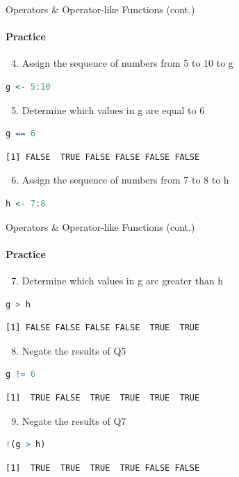 \begin{frame}[fragile]{Operators \& Operator-like Functions (cont.)}
\framesubtitle{Practice}
\begin{enumerate}\setcounter{enumi}{3}
  \item Assign the sequence of numbers from 5 to 10 to g
\end{enumerate}
\begin{lstlisting}[language=R]
g <- 5:10
\end{lstlisting}
\begin{enumerate}\setcounter{enumi}{4}
  \item Determine which values in g are equal to 6
\end{enumerate}
\begin{lstlisting}[language=R]
g == 6
\end{lstlisting}
\begin{lstlisting}[style=output]
[1] FALSE  TRUE FALSE FALSE FALSE FALSE
\end{lstlisting}
\begin{enumerate}\setcounter{enumi}{5}
  \item Assign the sequence of numbers from 7 to 8 to h
\end{enumerate}
\begin{lstlisting}[language=R]
h <- 7:8
\end{lstlisting}
\end{frame}

\begin{frame}[fragile]{Operators \& Operator-like Functions (cont.)}
\framesubtitle{Practice}
\begin{enumerate}\setcounter{enumi}{6}
  \item Determine which values in g are greater than h
\end{enumerate}
\begin{lstlisting}[language=R]
g > h
\end{lstlisting}
\begin{lstlisting}[style=output]
[1] FALSE FALSE FALSE FALSE  TRUE  TRUE
\end{lstlisting}
\begin{enumerate}\setcounter{enumi}{7}
  \item Negate the results of Q5
\end{enumerate}
\begin{lstlisting}[language=R]
g != 6
\end{lstlisting}
\begin{lstlisting}[style=output]
[1]  TRUE FALSE  TRUE  TRUE  TRUE  TRUE
\end{lstlisting}
\begin{enumerate}\setcounter{enumi}{8}
  \item Negate the results of Q7
\end{enumerate}
\begin{lstlisting}[language=R]
!(g > h)
\end{lstlisting}
\begin{lstlisting}[style=output]
[1]  TRUE  TRUE  TRUE  TRUE FALSE FALSE
\end{lstlisting}
\end{frame}

